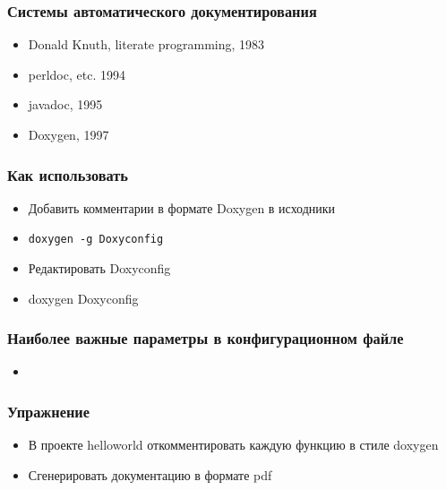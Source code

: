 \begin{frame}
 \frametitle{Системы автоматического документирования}
 \begin{itemize}
  \item Donald Knuth, literate programming, 1983
  \item perldoc, etc. 1994
  \item javadoc, 1995
  \item Doxygen, 1997
 \end{itemize}
\end{frame}

\begin{frame}
 \frametitle{Как использовать}
 \begin{itemize}
  \item Добавить комментарии в формате Doxygen в исходники
  \item \texttt{doxygen -g Doxyconfig}
  \item Редактировать Doxyconfig
  \item doxygen Doxyconfig
 \end{itemize}
\end{frame}

\begin{frame}
 \frametitle{Наиболее важные параметры в конфигурационном файле}
 \begin{itemize}
  \item
 \end{itemize}
\end{frame}

\begin{frame}
 \frametitle{Упражнение}
  \begin{itemize}
    \item В проекте helloworld откомментировать каждую функцию в стиле doxygen
    \item Сгенерировать документацию в формате pdf
  \end{itemize}
\end{frame} 
